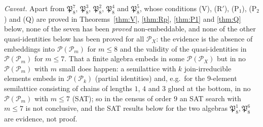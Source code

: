 \documentclass[11pt]{amsart}
\theoremstyle{definition}
\renewcommand{\P}{\mathcal{P}}
\begin{document}
\emph{Caveat.} Apart from $\mathfrak P_8^7$, $\mathfrak P_8^3$, $\mathfrak P_8^2$, $\mathfrak P_8^4$ and $\mathfrak P_8^5$, whose conditions (V), (R$'$), (P$_1$), (P$_2$) and (Q) are proved in Theorems~\ref{thm:V}, \ref{thm:Rp}, \ref{thm:P1} and \ref{thm:Q} below, none of the seven has been \emph{proved} non-embeddable, and none of the other quasi-identities below has been proved for all $\P_X$: the evidence is the absence of embeddings into $\P(\P_m)$ for $m\le8$ and the validity of the quasi-identities in $\P(\P_m)$ for $m\le7$. That a finite algebra embeds in some $\P(\P_X)$ but in no $\P(\P_m)$ with $m$ small does happen: a semilattice with $k$ join-irreducible elements embeds in $\P(\P_k)$ (partial identities) and, e.g.\ for the $9$-element semilattice consisting of chains of lengths $1$, $4$ and $3$ glued at the bottom, in no $\P(\P_m)$ with $m\le7$ (SAT); so in the census of order $9$ an SAT search with $m\le7$ is not conclusive, and the SAT results below for the two algebras $\mathfrak P_8^1,\mathfrak P_8^6$ are evidence, not proof.
\end{document}
